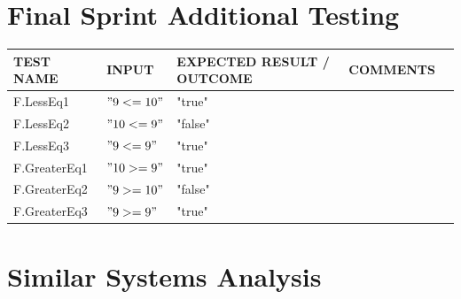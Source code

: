 \documentclass[a4paper, oneside, 11pt]{report}
\begin{document}
    \section{Final Sprint Additional Testing}
    \label{FinalTest}
    \begin{tabular}{|p{1.5in}|p{1.5in}|p{1.6in}|p{1.6in}|p{2.4in}|}
        \hline
        TEST NAME       & INPUT                     & EXPECTED RESULT / OUTCOME              & COMMENTS                                \\
        \hline
        F.LessEq1                         & $"9 <= 10"$                                & "true"        &                \\
        \hline
        F.LessEq2                         & $"10 <= 9"$                                & "false"       &                \\
        \hline
        F.LessEq3                         & $"9 <= 9"$                                 & "true"        &                \\
        \hline
        F.GreaterEq1                      & $"10 >= 9"$                                & "true"        &                \\
        \hline
        F.GreaterEq2                      & $"9 >= 10"$                                & "false"       &                \\
        \hline
        F.GreaterEq3                      & $"9 >= 9"$                                 & "true"        &                \\
        \hline
    \end{tabular}
    \clearpage
    \section{Similar Systems Analysis} \label{SSA}
\end{document}
